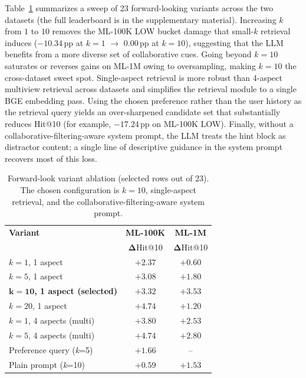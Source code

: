 \documentclass[11pt]{article}
\begin{document}
Table~\ref{tab:forward_ablation} summarizes a sweep of 23 forward-looking variants across the two datasets (the full leaderboard is in the supplementary material). Increasing $k$ from $1$ to $10$ removes the ML-100K LOW bucket damage that small-$k$ retrieval induces ($-10.34$\,pp at $k{=}1$ $\to$ $0.00$\,pp at $k{=}10$), suggesting that the LLM benefits from a more diverse set of collaborative cues. Going beyond $k{=}10$ saturates or reverses gains on ML-1M owing to oversampling, making $k{=}10$ the cross-dataset sweet spot. Single-aspect retrieval is more robust than 4-aspect multiview retrieval across datasets and simplifies the retrieval module to a single BGE embedding pass. Using the chosen preference rather than the user history as the retrieval query yields an over-sharpened candidate set that substantially reduces Hit@10 (for example, $-17.24$\,pp on ML-100K LOW). Finally, without a collaborative-filtering-aware system prompt, the LLM treats the hint block as distractor content; a single line of descriptive guidance in the system prompt recovers most of this loss.

\begin{table}[!t]
\centering
\small
\setlength{\tabcolsep}{7pt}
\begin{tabular}{lcc}
\toprule
\textbf{Variant} & \textbf{ML-100K} & \textbf{ML-1M} \\
                 & $\mathbf{\Delta}$Hit@10 & $\mathbf{\Delta}$Hit@10 \\
\midrule
$k{=}1$, 1 aspect          & $+2.37$ & $+0.60$\\
$k{=}5$, 1 aspect          & $+3.08$ & $+1.80$\\
$\mathbf{k{=}10}$\textbf{, 1 aspect (selected)} & $\mathbf{+3.32}$ & $\mathbf{+3.53}$\\
$k{=}20$, 1 aspect         & $+4.74$ & $+1.20$\\
$k{=}1$, 4 aspects (multi) & $+3.80$ & $+2.53$\\
$k{=}5$, 4 aspects (multi) & $+4.74$ & $+2.80$\\
Preference query (\textit{k}=5)     & $+1.66$ & --\\
Plain prompt (\textit{k}=10)        & $+0.59$ & $+1.53$\\
\bottomrule
\end{tabular}
\caption{Forward-look variant ablation (selected rows out of 23). The chosen configuration is $k{=}10$, single-aspect retrieval, and the collaborative-filtering-aware system prompt.}
\label{tab:forward_ablation}
\end{table}
\end{document}
